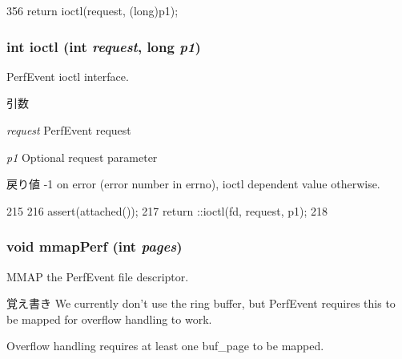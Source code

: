 \begin{DoxyCode}
356 { return ioctl(request, (long)p1); }
\end{DoxyCode}
\hypertarget{classPerfKvmCounter_a5b8772915b1f8991ad9f3f9afcd681b8}{
\subsubsection[{ioctl}]{\setlength{\rightskip}{0pt plus 5cm}int ioctl (int {\em request}, \/  long {\em p1})}}
\label{classPerfKvmCounter_a5b8772915b1f8991ad9f3f9afcd681b8}
PerfEvent ioctl interface.


\begin{DoxyParams}{引数}
\item[{\em request}]PerfEvent request \item[{\em p1}]Optional request parameter\end{DoxyParams}
\begin{DoxyReturn}{戻り値}
-\/1 on error (error number in errno), ioctl dependent value otherwise. 
\end{DoxyReturn}



\begin{DoxyCode}
215 {
216     assert(attached());
217     return ::ioctl(fd, request, p1);
218 }
\end{DoxyCode}
\hypertarget{classPerfKvmCounter_a32358ddbb202e0319d138e8cb3749ed9}{
\subsubsection[{mmapPerf}]{\setlength{\rightskip}{0pt plus 5cm}void mmapPerf (int {\em pages})}}
\label{classPerfKvmCounter_a32358ddbb202e0319d138e8cb3749ed9}
MMAP the PerfEvent file descriptor.

\begin{DoxyNote}{覚え書き}
We currently don't use the ring buffer, but PerfEvent requires this to be mapped for overflow handling to work.

Overflow handling requires at least one buf\_\-page to be mapped.
\end{DoxyNote}

